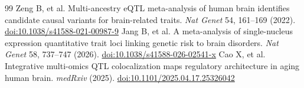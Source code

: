 \documentclass[11pt]{article}
\begin{document}
\begin{thebibliography}{99}
 Zeng B, et al. Multi-ancestry eQTL meta-analysis of human brain identifies candidate causal variants for brain-related traits. \emph{Nat Genet} 54, 161--169 (2022). \href{https://doi.org/10.1038/s41588-021-00987-9}{doi:10.1038/s41588-021-00987-9}
 Jang B, et al. A meta-analysis of single-nucleus expression quantitative trait loci linking genetic risk to brain disorders. \emph{Nat Genet} 58, 737--747 (2026). \href{https://doi.org/10.1038/s41588-026-02541-x}{doi:10.1038/s41588-026-02541-x}
 Cao X, et al. Integrative multi-omics QTL colocalization maps regulatory architecture in aging human brain. \emph{medRxiv} (2025). \href{https://doi.org/10.1101/2025.04.17.25326042}{doi:10.1101/2025.04.17.25326042}
\end{thebibliography}
\end{document}
